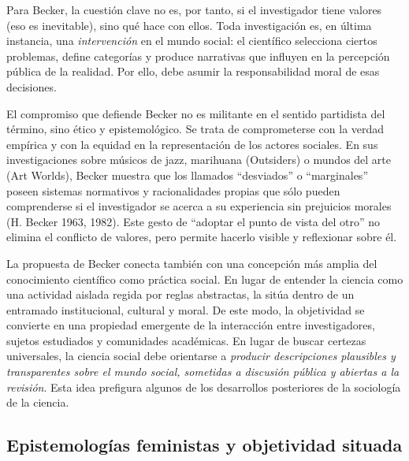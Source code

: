 \documentclass[
  spanish,
  letterpaper,
  DIV=11,
  numbers=noendperiod]{scrreprt}
\begin{document}
Para Becker, la cuestión clave no es, por tanto, si el investigador
tiene valores (eso es inevitable), sino qué hace con ellos. Toda
investigación es, en última instancia, una \emph{intervención} en el
mundo social: el científico selecciona ciertos problemas, define
categorías y produce narrativas que influyen en la percepción pública de
la realidad. Por ello, debe asumir la responsabilidad moral de esas
decisiones.

El compromiso que defiende Becker no es militante en el sentido
partidista del término, sino ético y epistemológico. Se trata de
comprometerse con la verdad empírica y con la equidad en la
representación de los actores sociales. En sus investigaciones sobre
músicos de jazz, marihuana (Outsiders) o mundos del arte (Art Worlds),
Becker muestra que los llamados ``desviados'' o ``marginales'' poseen
sistemas normativos y racionalidades propias que sólo pueden
comprenderse si el investigador se acerca a su experiencia sin
prejuicios morales (H. Becker 1963, 1982). Este gesto de ``adoptar el
punto de vista del otro'' no elimina el conflicto de valores, pero
permite hacerlo visible y reflexionar sobre él.

La propuesta de Becker conecta también con una concepción más amplia del
conocimiento científico como práctica social. En lugar de entender la
ciencia como una actividad aislada regida por reglas abstractas, la
sitúa dentro de un entramado institucional, cultural y moral. De este
modo, la objetividad se convierte en una propiedad emergente de la
interacción entre investigadores, sujetos estudiados y comunidades
académicas. En lugar de buscar certezas universales, la ciencia social
debe orientarse a \emph{producir descripciones plausibles y
transparentes sobre el mundo social, sometidas a discusión pública y
abiertas a la revisión}. Esta idea prefigura algunos de los desarrollos
posteriores de la sociología de la ciencia.

\subsection{Epistemologías feministas y objetividad
situada}\label{epistemologuxedas-feministas-y-objetividad-situada}
\end{document}
